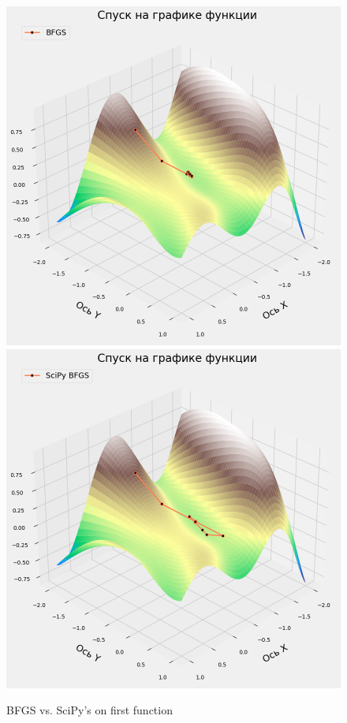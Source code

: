 \documentclass[12pt, a4paper, oneside, final]{article}
\begin{document}
	\begin{figure}[H]
		\centering
		\includegraphics[scale = 0.35]{Image/T2A_F1_BFGS.png}
		\includegraphics[scale = 0.35]{Image/T2A_F1_scipy_BFGS.png}
		\caption*{BFGS vs. SciPy's on first function}
	\end{figure}
\end{document}
